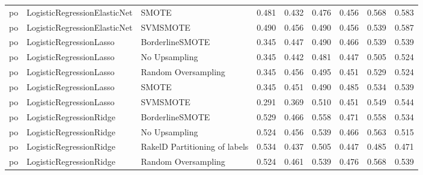 \begin{tabular}{lllllllll}
      po &    LogisticRegressionElasticNet &                         SMOTE & 0.481 &                     0.432 &                 0.476 &                  0.456 &                                   0.568 &     0.583 \\
      po &    LogisticRegressionElasticNet &                      SVMSMOTE & 0.490 &                     0.456 &                 0.490 &                  0.456 &                                   0.539 &     0.587 \\
      po &         LogisticRegressionLasso &               BorderlineSMOTE & 0.345 &                     0.447 &                 0.490 &                  0.466 &                                   0.539 &     0.539 \\
      po &         LogisticRegressionLasso &                 No Upsampling & 0.345 &                     0.442 &                 0.481 &                  0.447 &                                   0.505 &     0.524 \\
      po &         LogisticRegressionLasso &           Random Oversampling & 0.345 &                     0.456 &                 0.495 &                  0.451 &                                   0.529 &     0.524 \\
      po &         LogisticRegressionLasso &                         SMOTE & 0.345 &                     0.451 &                 0.490 &                  0.485 &                                   0.534 &     0.539 \\
      po &         LogisticRegressionLasso &                      SVMSMOTE & 0.291 &                     0.369 &                 0.510 &                  0.451 &                                   0.549 &     0.544 \\
      po &         LogisticRegressionRidge &               BorderlineSMOTE & 0.529 &                     0.466 &                 0.558 &                  0.471 &                                   0.558 &     0.534 \\
      po &         LogisticRegressionRidge &                 No Upsampling & 0.524 &                     0.456 &                 0.539 &                  0.466 &                                   0.563 &     0.515 \\
      po &         LogisticRegressionRidge & RakelD Partitioning of labels & 0.534 &                     0.437 &                 0.505 &                  0.447 &                                   0.485 &     0.471 \\
      po &         LogisticRegressionRidge &           Random Oversampling & 0.524 &                     0.461 &                 0.539 &                  0.476 &                                   0.568 &     0.539 \\

\end{tabular}

